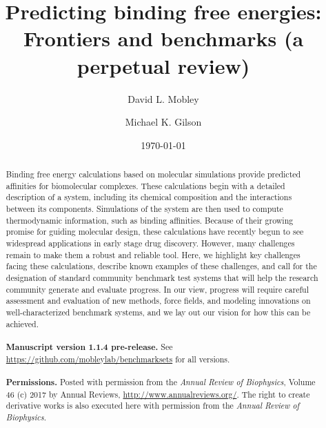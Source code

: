 \documentclass[aps,pre,twocolumn,nofootinbib,superscriptaddress,10pt, final,tightenlines]{revtex4-1}
\begin{document}
\title{Predicting binding free energies: Frontiers and benchmarks (a perpetual review)}

\author{David L. Mobley}
\author{Michael K. Gilson}


\date{\today}

\begin{abstract}
Binding free energy calculations based on molecular simulations provide predicted affinities for biomolecular complexes. 
These calculations begin with a detailed description of a system, including its chemical composition and the interactions between its components. 
Simulations of the system are then used to compute thermodynamic information, such as binding affinities. 
Because of their growing promise for guiding molecular design, these calculations have recently begun to see widespread applications in early stage drug discovery.
However, many challenges remain to make them a robust and reliable tool. 
Here, we highlight key challenges facing these calculations, describe known examples of these challenges, and call for the designation of standard community benchmark  test systems that will help the research community generate and evaluate progress.
In our view, progress will require careful assessment and evaluation of new methods, force fields, and modeling innovations on well-characterized benchmark systems, and we lay out our vision for how this can be achieved.
\\
\\
{\bf Manuscript version 1.1.4 pre-release.} See \url{https://github.com/mobleylab/benchmarksets} for all versions.
\\
\\
{{\bf Permissions.} Posted with permission from the \emph{Annual Review of Biophysics}, Volume 46 (c) 2017 by Annual Reviews, \url{http://www.annualreviews.org/}. The right to create derivative works is also executed here with permission from the \emph{Annual Review of Biophysics}.}

\end{abstract}
\end{document}
